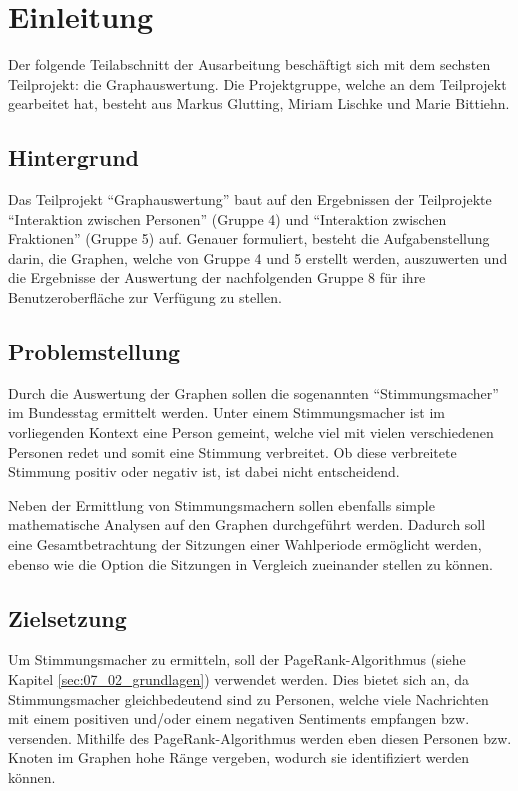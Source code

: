 \section{Einleitung}\label{sec:07_01_einleitung}

Der folgende Teilabschnitt der Ausarbeitung beschäftigt sich mit dem sechsten Teilprojekt: die Graphauswertung. Die Projektgruppe, welche an dem Teilprojekt gearbeitet hat, besteht aus Markus Glutting, Miriam Lischke und Marie Bittiehn.

\subsection{Hintergrund}
Das Teilprojekt ``Graphauswertung'' baut auf den Ergebnissen der Teilprojekte ``Interaktion zwischen Personen'' (Gruppe 4) und ``Interaktion zwischen Fraktionen'' (Gruppe 5) auf. Genauer formuliert, besteht die Aufgabenstellung darin, die Graphen, welche von Gruppe 4 und 5 erstellt werden, auszuwerten und die Ergebnisse der Auswertung der nachfolgenden Gruppe 8 für ihre Benutzeroberfläche zur Verfügung zu stellen.

\subsection{Problemstellung}
Durch die Auswertung der Graphen sollen die sogenannten ``Stimmungsmacher'' im Bundesstag ermittelt werden. Unter einem Stimmungsmacher ist im vorliegenden Kontext eine Person gemeint, welche viel mit vielen verschiedenen Personen redet und somit eine Stimmung verbreitet. Ob diese verbreitete Stimmung positiv oder negativ ist, ist dabei nicht entscheidend.

Neben der Ermittlung von Stimmungsmachern sollen ebenfalls simple mathematische Analysen auf den Graphen durchgeführt werden. Dadurch soll eine Gesamtbetrachtung der Sitzungen einer Wahlperiode ermöglicht werden, ebenso wie die Option die Sitzungen in Vergleich zueinander stellen zu können.

\subsection{Zielsetzung}

Um Stimmungsmacher zu ermitteln, soll der PageRank-Algorithmus (siehe Kapitel \ref{sec:07_02_grundlagen}) verwendet werden. Dies bietet sich an, da Stimmungsmacher gleichbedeutend sind zu Personen, welche viele Nachrichten mit einem positiven und/oder einem negativen Sentiments empfangen bzw. versenden. Mithilfe des PageRank-Algorithmus werden eben diesen Personen bzw. Knoten im Graphen hohe Ränge vergeben, wodurch sie identifiziert werden können.

